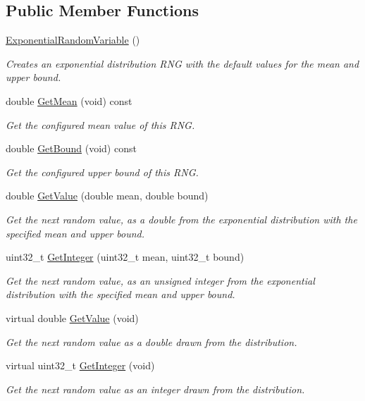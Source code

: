 \subsection*{Public Member Functions}
\begin{DoxyCompactItemize}
\item 
\hyperlink{classns3_1_1ExponentialRandomVariable_a2c74e018af3a86bce27f4858770095be}{Exponential\+Random\+Variable} ()
\begin{DoxyCompactList}\small\item\em Creates an exponential distribution R\+NG with the default values for the mean and upper bound. \end{DoxyCompactList}\item 
double \hyperlink{classns3_1_1ExponentialRandomVariable_ac0ad103cc60e19a890828470a05c8751}{Get\+Mean} (void) const 
\begin{DoxyCompactList}\small\item\em Get the configured mean value of this R\+NG. \end{DoxyCompactList}\item 
double \hyperlink{classns3_1_1ExponentialRandomVariable_aa51f27340bdcfb17364d8981bfa4c66a}{Get\+Bound} (void) const 
\begin{DoxyCompactList}\small\item\em Get the configured upper bound of this R\+NG. \end{DoxyCompactList}\item 
double \hyperlink{classns3_1_1ExponentialRandomVariable_a5d7a50466c0b0f036ec0fc1aa478f2c3}{Get\+Value} (double mean, double bound)
\begin{DoxyCompactList}\small\item\em Get the next random value, as a double from the exponential distribution with the specified mean and upper bound. \end{DoxyCompactList}\item 
uint32\+\_\+t \hyperlink{classns3_1_1ExponentialRandomVariable_ae872cfc2ae263cb38d0a14b6d8102492}{Get\+Integer} (uint32\+\_\+t mean, uint32\+\_\+t bound)
\begin{DoxyCompactList}\small\item\em Get the next random value, as an unsigned integer from the exponential distribution with the specified mean and upper bound. \end{DoxyCompactList}\item 
virtual double \hyperlink{classns3_1_1ExponentialRandomVariable_acac3b8014e1ae17e009ceb876d733c5f}{Get\+Value} (void)
\begin{DoxyCompactList}\small\item\em Get the next random value as a double drawn from the distribution. \end{DoxyCompactList}\item 
virtual uint32\+\_\+t \hyperlink{classns3_1_1ExponentialRandomVariable_afcc9f25011bd3fbe0b69c4e31cf212fc}{Get\+Integer} (void)
\begin{DoxyCompactList}\small\item\em Get the next random value as an integer drawn from the distribution. \end{DoxyCompactList}\end{DoxyCompactItemize}
